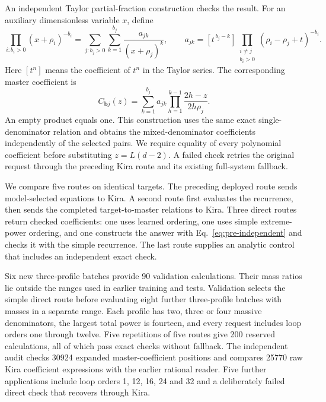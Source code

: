 An independent Taylor partial-fraction construction checks the result.
For an auxiliary dimensionless variable \(x\), define
\begin{equation}
 \prod_{i:b_i>0}(x+\rho_i)^{-b_i}
 =\sum_{j:b_j>0}\sum_{k=1}^{b_j}\frac{a_{jk}}{(x+\rho_j)^k},
 \qquad
 a_{jk}=[t^{\,b_j-k}]
       \prod_{\substack{i\ne j\\b_i>0}}
       (\rho_i-\rho_j+t)^{-b_i}.
 \label{eq:pre-taylor}
\end{equation}
Here \([t^n]\) means the coefficient of \(t^n\) in the Taylor series.
The corresponding master coefficient is
\begin{equation}
 C_{\boldsymbol b j}(z)=
 \sum_{k=1}^{b_j}a_{jk}
 \prod_{h=1}^{k-1}\frac{2h-z}{2h\rho_j}.
 \label{eq:pre-independent}
\end{equation}
An empty product equals one. This construction uses the same exact
single-denominator relation and obtains the mixed-denominator
coefficients independently of the selected pairs.
We require equality of every polynomial coefficient before substituting
\(z=L(d-2)\). A failed check retries the original request through the
preceding Kira route and its existing full-system fallback.

We compare five routes on identical targets. The preceding deployed route
sends model-selected equations to Kira. A second route first evaluates
the recurrence, then sends the completed target-to-master relations to
Kira. Three direct routes return checked coefficients: one uses learned
ordering, one uses simple extreme-power ordering, and one constructs
the answer with Eq.~\eqref{eq:pre-independent} and checks it with the
simple recurrence. The last route supplies an analytic control that
includes an independent exact check.

Six new three-profile batches provide 90 validation calculations.
Their mass ratios lie outside the ranges used in earlier training and
tests. Validation selects the simple direct route before evaluating eight
further three-profile batches with masses in a separate range.
Each profile has two, three or four massive denominators, the largest
total power is fourteen, and every request includes loop orders one
through twelve. Five repetitions of five routes give 200 reserved
calculations, all of which pass exact checks without fallback.
The independent audit checks 30924 expanded master-coefficient
positions and compares 25770 raw Kira coefficient expressions with the
earlier rational reader. Five further applications include loop orders
1, 12, 16, 24 and 32 and a deliberately failed direct check that recovers
through Kira.

